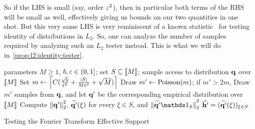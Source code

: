So if the LHS is small (say, order $\varepsilon^2$), then in particular both terms of the RHS will be small as well, effectively giving us bounds on our two quantities in one shot. But this very same LHS is very reminiscent of a known statistic~\cite{CDVV:14} for testing identity of distributions in $L_2$. So, 
one can analyze the number of samples required by analyzing such an $L_2$ tester instead. 
This is what we will do in~\cref{prop:l2:identity:tester}.

\begin{algorithm}
  \begin{algorithmic}[1]
    \Require parameters $M\geq 1$, $b,\varepsilon\in(0,1]$; set $S\subseteq \llbracket M\rrbracket$; sample access to distribution $\mathbf{q}$ over $\llbracket M\rrbracket$
    \State\label{algo:ft:step:choosemprime} Set $m\gets \left\lceil C(\frac{\sqrt{b}}{\varepsilon^2}+ \frac{\left\lvert S \right\rvert}{M\varepsilon^2}+ \sqrt{M}) \right\rceil$     \State Draw $m'\gets \operatorname{Poisson}\!\left( m \right) $; if $m'>2m$, \Return \reject
    \State\label{algo:ft:step:empr} Draw $m'$ samples from $\mathbf{q}$, and let $\mathbf{q}'$ be the corresponding empirical distribution over $\llbracket M\rrbracket$
    \State\label{algo:ft:step:norm} Compute ${\lVert\mathbf{q}'{\rVert}}_2^2$, $\widehat{\mathbf{q}'}(\xi)$ for every $\xi\in S$, and $\normtwo{\fourier{\q'}\indicSet{S}}^2$ 
    \label{algo:ft:step:norm:check} \Return \reject
     \Return \reject
    \Else
      \State \Return $\widehat{\mathbf{h}'}=(\widehat{\mathbf{q}'}(\xi))_{\xi\in S}$
    \EndIf
  \end{algorithmic}
  \caption{Testing the Fourier Transform Effective Support}\label{algo:ft:effective:support}
\end{algorithm}

